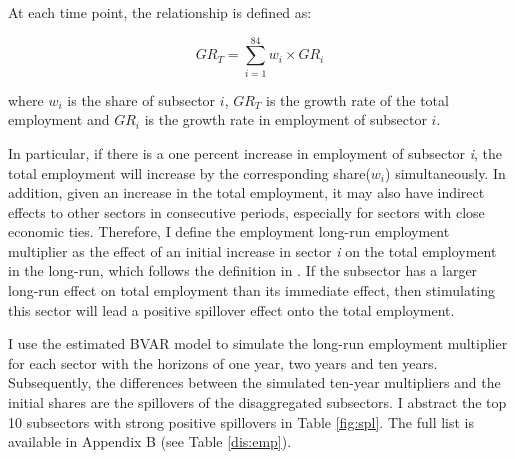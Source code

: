 \documentclass{monashthesis}
\begin{document}
At each time point, the relationship is defined as:

\[
GR_T=\sum_{i=1}^{84} w_i\times {GR}_i
\]

where \(w_i\) is the share of subsector \(i\), \(GR_T\) is the growth rate of the total employment and \(GR_i\) is the growth rate in employment of subsector \(i\).

In particular, if there is a one percent increase in employment of subsector \emph{i}, the total employment will increase by the corresponding share(\(w_i\)) simultaneously. In addition, given an increase in the total employment, it may also have indirect effects to other sectors in consecutive periods, especially for sectors with close economic ties. Therefore, I define the employment long-run employment multiplier as the effect of an initial increase in sector \emph{i} on the total employment in the long-run, which follows the definition in \textcite{anderson2020}. If the subsector has a larger long-run effect on total employment than its immediate effect, then stimulating this sector will lead a positive spillover effect onto the total employment.

I use the estimated BVAR model to simulate the long-run employment multiplier for each sector with the horizons of one year, two years and ten years. Subsequently, the differences between the simulated ten-year multipliers and the initial shares are the spillovers of the disaggregated subsectors. I abstract the top 10 subsectors with strong positive spillovers in Table \ref{fig:spl}. The full list is available in Appendix B (see Table \ref{dis:emp}).
\end{document}

